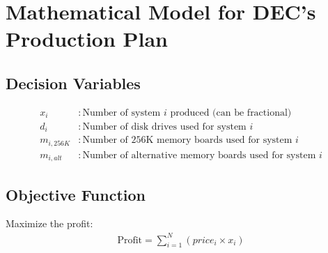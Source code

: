 \documentclass{article}
\begin{document}
\section*{Mathematical Model for DEC's Production Plan}

\subsection*{Decision Variables}
\begin{align*}
x_i & : \text{Number of system } i \text{ produced (can be fractional)} \\
d_i & : \text{Number of disk drives used for system } i \\
m_{i,256K} & : \text{Number of 256K memory boards used for system } i \\
m_{i,alt} & : \text{Number of alternative memory boards used for system } i
\end{align*}

\subsection*{Objective Function}
Maximize the profit:
\begin{align*}
\text{Profit} = \sum_{i=1}^{N} \left(price_i \times x_i \right)
\end{align*}
\end{document}
